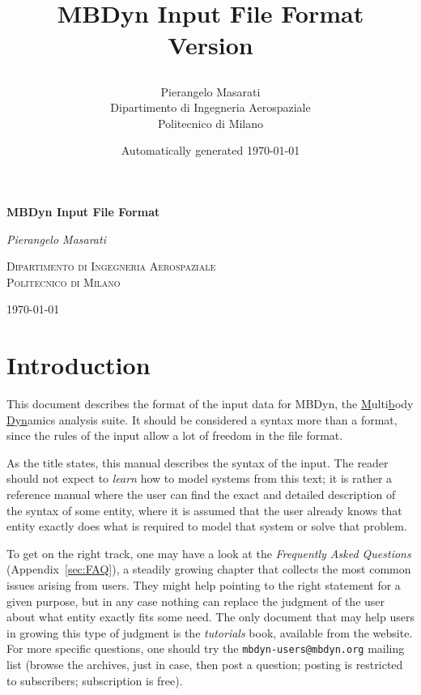 \documentclass[10pt,dvips]{report}
\newcommand{\kw}[1]{\texttt{#1}}
\begin{document}
\begin{latexonly}
\title{\bf MBDyn Input File Format \\
Version

}
\author{Pierangelo Masarati \vspace{5mm}\\
    \sc Dipartimento di Ingegneria Aerospaziale \\
    \sc Politecnico di Milano}
\date{Automatically generated \today}
\maketitle
\end{latexonly}

\begin{htmlonly}
\begin{center}
\textbf{\LARGE MBDyn Input File Format}

\emph{\large Pierangelo Masarati}

\textsc{Dipartimento di Ingegneria Aerospaziale \\ Politecnico di Milano}

\today
\end{center}
\end{htmlonly}

\pagestyle{plain}

\tableofcontents
\newpage
\listoffigures
\newpage
\listoftables
\newpage

\chapter*{Introduction}
This document describes the format of the input data for MBDyn,
the \underline{M}ulti\underline{b}ody \underline{Dyn}amics analysis suite.
It should be considered a syntax more than a format, since the rules of the
input allow a lot of freedom in the file format. 

As the title states, this manual describes the syntax of the input.
The reader should not expect to \emph{learn} how to model systems
from this text; it is rather a reference manual where the user
can find the exact and detailed description of the syntax of some
entity, where it is assumed that the user already knows that entity
exactly does what is required to model that system or solve that problem.

To get on the right track, one may have a look at the 
\emph{Frequently Asked Questions} (Appendix~\ref{sec:FAQ}),
a steadily growing chapter that collects the most common issues
arising from users.
They might help pointing to the right statement for a given purpose,
but in any case nothing can replace the judgment of the user
about what entity exactly fits some need.
The only document that may help users in growing this type of judgment
is the \emph{tutorials} book, available from the website.
For more specific questions, one should try the \kw{mbdyn-users@mbdyn.org}
mailing list (browse the archives, just in case, then post a question;
posting is restricted to subscribers; subscription is free).
\end{document}
